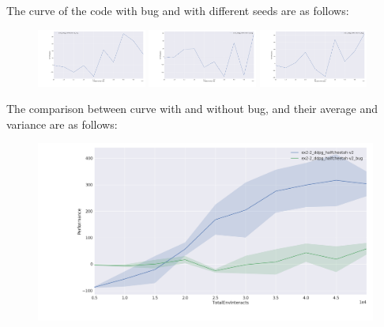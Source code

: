 \begin{homeworkProblem}
\begin{itemize}
    The curve of the code with bug and with different seeds are as follows:
    \begin{figure}[H]
        \centering
        \includegraphics[width=0.32\textwidth]{../Img/spinningup_exercises/2_2/2_2_bug_curve_s0.png}
        \includegraphics[width=0.32\textwidth]{../Img/spinningup_exercises/2_2/2_2_bug_curve_s10.png}
        \includegraphics[width=0.32\textwidth]{../Img/spinningup_exercises/2_2/2_2_bug_curve_s20.png}
    \end{figure}

    The comparison between curve with and without bug, and their average and variance are as follows:
    \begin{figure}[H]
        \centering
        \includegraphics[width=\textwidth]{../Img/spinningup_exercises/2_2/2_2_curve_all.png}
    \end{figure}


\end{itemize}
\end{homeworkProblem}

